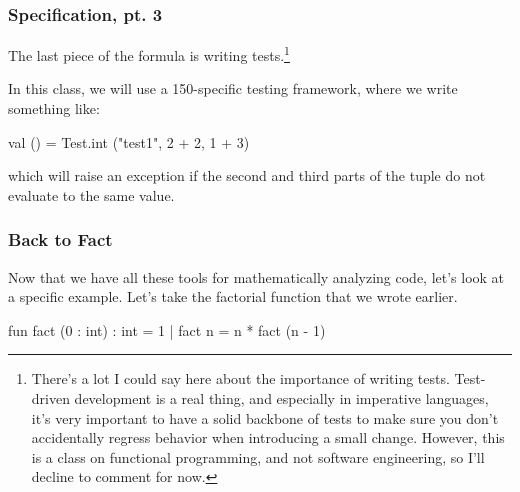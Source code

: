 \documentclass[aspectratio=169]{beamer}
\begin{document}
\begin{frame}[fragile]
  \frametitle{Specification, pt. 3}

  The last piece of the formula is writing tests.\footnote{
    There's a lot I could say here about the importance
    of writing tests. Test-driven development is a real thing, and especially
    in imperative languages, it's very important to have a solid backbone
    of tests to make sure you don't accidentally regress behavior when
    introducing a small change. However, this is a class on functional
    programming, and not software engineering, so I'll decline to comment
    for now.\footnotemark
  }

  \pause
  \vspace{\fill}

  In this class, we will use a 150-specific testing framework, where
  we write something like:

  \begin{codeblock}
    val () = Test.int ("test1", 2 + 2, 1 + 3)
  \end{codeblock}
  which will raise an exception if the second and third parts of the
  tuple do not evaluate to the same value.

  \vspace{\fill}


\end{frame}

\begin{frame}[fragile]
  \frametitle{Back to Fact}

  Now that we have all these tools for mathematically analyzing
  code, let's look at a specific example. Let's take the factorial
  function that we wrote earlier.

  \vspace{\fill}

  \begin{codeblock}
    fun fact (0 : int) : int = 1
      | fact n = n * fact (n - 1)
  \end{codeblock}

  \pause
  \vspace{\fill}

\end{frame}
\end{document}
